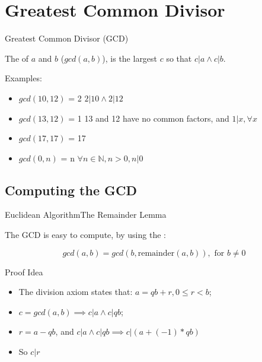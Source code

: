 \section{Greatest Common Divisor}


\begin{frame}{Greatest Common Divisor (GCD)}

  The  of $a$ and $b$ ($gcd(a,b)$), is the largest $c$ so that $c|a \land c|b$.\bigskip

  Examples:
  \begin{itemize}
  \item $gcd(10,12)$ = 2 \hfill $2|10 \land 2|12$
  \item $gcd(13,12)$ = 1 \hfill 13 and 12 have no common factors, and $1|x, \forall x$
  \item $gcd(17,17)$ = 17
  \item $gcd(0,n)$ = n \hfill $\forall n\in\mathbb{N}, n > 0, n|0$
  \end{itemize}
\end{frame}


\subsection{Computing the GCD}
\begin{frame}{Euclidean Algorithm}{The Remainder Lemma}

  The GCD is easy to compute, by using the :\bigskip

  \begin{equation*}
    gcd(a,b) = gcd(b, \text{remainder}(a,b)), \text{ for } b\neq 0
  \end{equation*}\bigskip

  \begin{block}{Proof Idea}

    \begin{itemize}
    \item The division axiom states that: $a = qb + r, 0\leq r < b$;
    \item $c = gcd(a,b) \implies c|a \land c|qb$;
    \item $r = a - qb$, and $c|a \land c|qb \implies c|(a + (-1)*qb)$
    \item So $c|r$
    \end{itemize}
  \end{block}
\end{frame}

